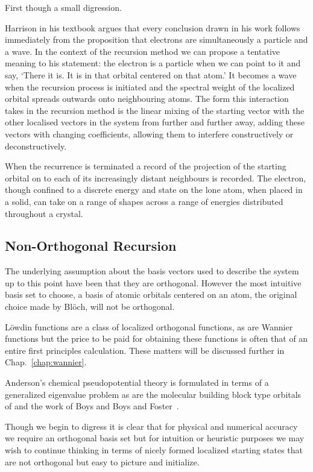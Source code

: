 First though a small digression.

Harrison in his textbook argues that every conclusion drawn in 
his work follows immediately from the proposition that electrons 
are simultaneously a particle and a wave. 
In the context of the recursion method we can propose 
a tentative meaning to his statement: the electron is a 
particle when we can point to it and say, `There it is. 
It is in that orbital centered on that atom.' It becomes a wave 
when the recursion process is initiated and the spectral weight of the 
localized orbital spreads outwards onto neighbouring atoms. 
The form this interaction takes in the recursion method 
is the linear mixing of the starting vector
with the other localised vectors in the system from 
further and further away, adding these vectors with changing coefficients,
allowing them to interfere constructively or deconstructively. 

When the recurrence is terminated a record of the projection of 
the starting orbital on to each of its increasingly distant neighbours 
is recorded. The electron, though confined to a discrete energy 
and state on the lone atom, when placed in a solid, can 
take on a range of shapes across a range of energies distributed 
throughout a crystal.

\subsection{Non-Orthogonal Recursion}
\label{sec:tensornotation}
The underlying assumption about the basis vectors
used to describe the system up to this point have 
been that they are orthogonal. However the most intuitive basis set to 
choose, a basis of atomic orbitals centered on an atom, 
the original choice made by Bl\"och, will not be orthogonal. 

L\"owdin functions are a class of localized orthogonal functions,
as are Wannier functions but the price to be paid for
obtaining these functions is often that of an entire 
first principles calculation. These matters will 
be discussed further in Chap.~\ref{chap:wannier}.

Anderson's chemical pseudopotential theory is formulated 
in terms of a generalized eigenvalue problem \cite{anderson68,anderson69}
as are the molecular building block type orbitals of \cite{edmiston63} 
and the work of Boys and Boys and Foster~\cite{boys60a,boys60b}. 

Though we begin to digress it is clear that for physical 
and numerical accuracy we require an orthogonal basis 
set but for intuition or heuristic purposes we may wish to continue thinking
in terms of nicely formed localized starting states that 
are not orthogonal but easy to picture and initialize.

